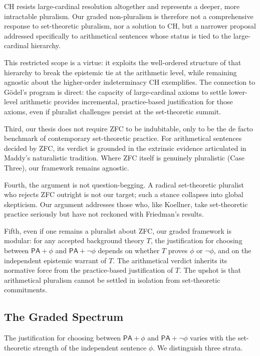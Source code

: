 \documentclass[a4paper,12pt]{amsart}
\theoremstyle{definition}
\numberwithin{equation}{section}
\begin{document}
{\sf CH} resists large-cardinal resolution altogether and represents a deeper, more intractable pluralism. Our graded non-pluralism is therefore not a comprehensive response to set-theoretic pluralism, nor a solution to {\sf CH}, but a narrower proposal addressed specifically to arithmetical sentences whose status is tied to the large-cardinal hierarchy. 

This restricted scope is a virtue: it exploits the well-ordered structure of that hierarchy to break the epistemic tie at the arithmetic level, while remaining agnostic about the higher-order indeterminacy {\sf CH} exemplifies. The connection to G\"odel's program is direct: the capacity of large-cardinal axioms to settle lower-level arithmetic provides incremental, practice-based justification for those axioms, even if pluralist challenges persist at the set-theoretic summit.

Third, our thesis does not require {\sf ZFC} to be indubitable, only to be the de facto benchmark of contemporary set-theoretic practice. For arithmetical sentences decided by {\sf ZFC}, its verdict is grounded in the extrinsic evidence articulated in Maddy's naturalistic tradition. Where {\sf ZFC} itself is genuinely pluralistic (Case Three), our framework remains agnostic.
 
Fourth, the argument is not question-begging. A radical set-theoretic pluralist who rejects {\sf ZFC} outright is not our target; such a stance collapses into global skepticism. Our argument addresses those who, like Koellner, take set-theoretic practice seriously but have not reckoned with Friedman's results.


Fifth, even if one remains a pluralist about {\sf ZFC}, our graded framework is modular: for any accepted background theory \(T\), the justification for choosing between $\mathsf{PA}+\phi$ and $\mathsf{PA}+\neg\phi$ depends on whether \(T\) proves \(\phi\) or \(\neg \phi\), and on the independent epistemic warrant of \(T\). The arithmetical verdict inherits its normative force from the practice-based justification of \(T\). The upshot is that arithmetical pluralism cannot be settled in isolation from set-theoretic commitments.

\subsection{The Graded Spectrum}
The justification for choosing between $\mathsf{PA}+\phi$ and 
$\mathsf{PA}+\neg\phi$ varies with the set-theoretic strength of the 
independent sentence $\phi$. We distinguish three strata.
  
\end{document}
